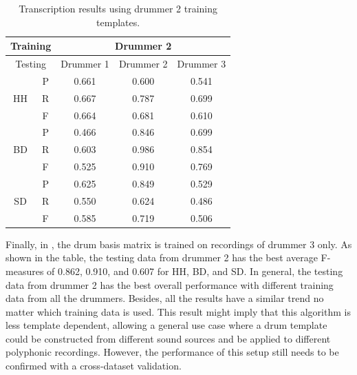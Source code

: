 \documentclass{article}
\begin{document}
\begin{table}[h]
\begin{center}
\begin{tabular}{|c|c|c|c|c|}
\hline
\multicolumn{2}{|c}{Training} & \multicolumn{3}{|c|}{Drummer 2}   \\ \hline
\multicolumn{2}{|c|}{Testing} & Drummer 1 & Drummer 2 & Drummer 3 \\ \hline
\multirow{3}{*}{HH}    & P    & 0.661     & 0.600     & 0.541     \\ \cline{2-5} 
                       & R    & 0.667     & 0.787     & 0.699     \\ \cline{2-5} 
                       & F    & 0.664     & 0.681     & 0.610     \\ \hline
\multirow{3}{*}{BD}    & P    & 0.466     & 0.846     & 0.699     \\ \cline{2-5} 
                       & R    & 0.603     & 0.986     & 0.854     \\ \cline{2-5} 
                       & F    & 0.525     & 0.910     & 0.769     \\ \hline
\multirow{3}{*}{SD}    & P    & 0.625     & 0.849     & 0.529     \\ \cline{2-5} 
                       & R    & 0.550     & 0.624     & 0.486     \\ \cline{2-5} 
                       & F    & 0.585     & 0.719     & 0.506     \\ \hline
\end{tabular}
 \caption{Transcription results using drummer 2 training templates.}
 \label{tab:trainDr2}
\end{center}
\end{table}

Finally, in , the drum basis matrix is trained on recordings of drummer 3 only. As shown in the table, the testing data from drummer 2 has the best average F-measures of 0.862, 0.910, and 0.607 for HH, BD, and SD. In general, the testing data from drummer 2 has the best overall performance with different training data from all the drummers. Besides, all the results have a similar trend no matter which training data is used. This result might imply that this algorithm is less template dependent, allowing a general use case where a drum template could be constructed from different sound sources and be applied to different polyphonic recordings. However, the performance of this setup still needs to be confirmed with a cross-dataset validation.      
\end{document}
